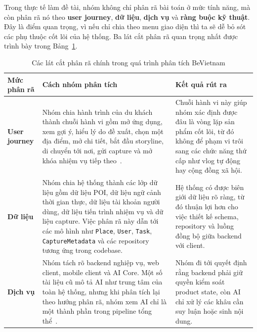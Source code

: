 Trong thực tế làm đề tài, nhóm không chỉ phân rã bài toán ở mức tính
năng, mà còn phân rã nó theo \textbf{user journey}, \textbf{dữ liệu},
\textbf{dịch vụ} và \textbf{ràng buộc kỹ thuật}. Đây là điểm quan
trọng, vì nếu chỉ chia theo menu giao diện thì ta sẽ dễ bỏ sót các phụ
thuộc cốt lõi của hệ thống. Ba lát cắt phân rã quan trọng nhất được trình
bày trong Bảng~\ref{tab:decomposition_views}.

\begin{table}[H]
\centering
\caption{Các lát cắt phân rã chính trong quá trình phân tích BeVietnam}
\label{tab:decomposition_views}
\begin{tabularx}{\textwidth}{>{\raggedright\arraybackslash}p{2.2cm} X X}
\toprule
\textbf{Mức phân rã} & \textbf{Cách nhóm phân tích} & \textbf{Kết quả rút ra} \\
\midrule
\textbf{User journey} & Nhóm chia hành trình của du khách thành chuỗi hành vi gồm mở ứng dụng, xem gợi ý, hiểu lý do đề xuất, chọn một địa điểm, mở chi tiết, bắt đầu storyline, di chuyển tới nơi, gửi capture và mở khóa nhiệm vụ tiếp theo~\cite{bevietnam_spec}. & Chuỗi hành vi này giúp nhóm xác định được đâu là vòng lặp sản phẩm cốt lõi, từ đó không để phạm vi trôi sang các chức năng thứ cấp như vlog tự động hay cộng đồng xã hội. \\
\textbf{Dữ liệu} & Nhóm chia hệ thống thành các lớp dữ liệu gồm dữ liệu POI, dữ liệu ngữ cảnh thời gian thực, dữ liệu tài khoản người dùng, dữ liệu tiến trình nhiệm vụ và dữ liệu capture. Việc phân rã này dẫn tới các mô hình như \texttt{Place}, \texttt{User}, \texttt{Task}, \texttt{CaptureMetadata} và các repository tương ứng trong codebase. & Hệ thống có được biên giới dữ liệu rõ ràng, từ đó thuận lợi hơn cho việc thiết kế schema, repository và luồng đồng bộ giữa backend với client. \\
\textbf{Dịch vụ} & Nhóm tách rõ backend nghiệp vụ, web client, mobile client và AI Core. Một số tài liệu cũ mô tả AI như trung tâm của toàn hệ thống, nhưng khi phân tích lại theo hướng phân rã, nhóm xem AI chỉ là một thành phần trong pipeline tổng thể~\cite{bevietnam_spec}. & Nhóm đi tới quyết định rằng backend phải giữ quyền kiểm soát product state, còn AI chỉ xử lý các khâu cần suy luận hoặc sinh nội dung. \\
\bottomrule
\end{tabularx}
\end{table}

